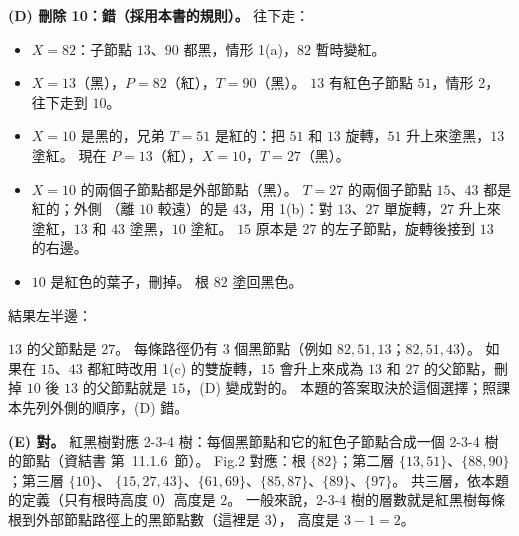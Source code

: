 \begin{pastsoln}
\textbf{(D) 刪除 10：錯（採用本書的規則）。} 往下走：
\begin{itemize}
\item $X = 82$：子節點 $13$、$90$ 都黑，情形 1(a)，$82$ 暫時變紅。
\item $X = 13$（黑），$P = 82$（紅），$T = 90$（黑）。 $13$ 有紅色子節點 $51$，情形 2，往下走到 $10$。
\item $X = 10$ 是黑的，兄弟 $T = 51$ 是紅的：把 $51$ 和 $13$ 旋轉，$51$ 升上來塗黑，$13$ 塗紅。 現在
$P = 13$（紅），$X = 10$，$T = 27$（黑）。
\item $X = 10$ 的兩個子節點都是外部節點（黑）。 $T = 27$ 的兩個子節點 $15$、$43$ 都是紅的；外側
（離 $10$ 較遠）的是 $43$，用 1(b)：對 $13$、$27$ 單旋轉，$27$ 升上來塗紅，$13$ 和 $43$ 塗黑，$10$
塗紅。 $15$ 原本是 $27$ 的左子節點，旋轉後接到 $13$ 的右邊。
\item $10$ 是紅色的葉子，刪掉。 根 $82$ 塗回黑色。
\end{itemize}
結果左半邊：
\begin{center}
\end{center}
$13$ 的父節點是 $27$。 每條路徑仍有 $3$ 個黑節點（例如 $82, 51, 13$；$82, 51, 43$）。 如果在 $15$、$43$
都紅時改用 1(c) 的雙旋轉，$15$ 會升上來成為 $13$ 和 $27$ 的父節點，刪掉 $10$ 後 $13$ 的父節點就是
$15$，(D) 變成對的。 本題的答案取決於這個選擇；照課本先列外側的順序，(D) 錯。

\textbf{(E) 對。} 紅黑樹對應 2-3-4 樹：每個黑節點和它的紅色子節點合成一個 2-3-4 樹的節點（資結書
第~11.1.6~節）。 Fig.2 對應：根 $\{82\}$；第二層 $\{13, 51\}$、$\{88, 90\}$；第三層 $\{10\}$、
$\{15, 27, 43\}$、$\{61, 69\}$、$\{85, 87\}$、$\{89\}$、$\{97\}$。 共三層，依本題的定義（只有根時高度
$0$）高度是 $2$。 一般來說，2-3-4 樹的層數就是紅黑樹每條根到外部節點路徑上的黑節點數（這裡是 $3$），
高度是 $3 - 1 = 2$。
\end{pastsoln}
